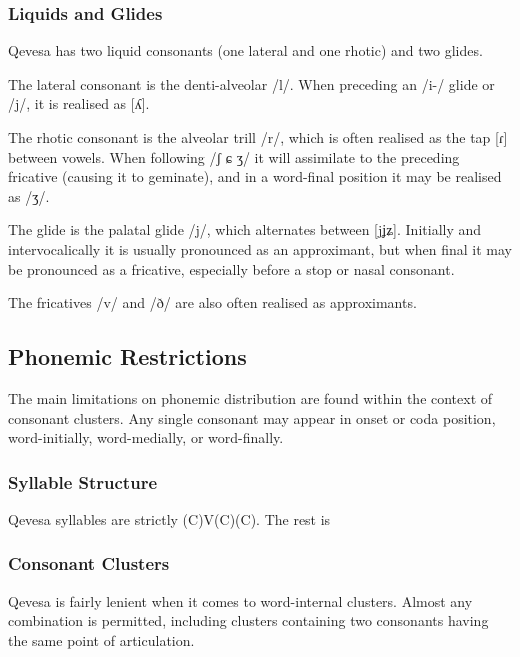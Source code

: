 \documentclass[grammar]{subfiles}
\begin{document}


\subsubsection{Liquids and Glides}
\label{sssec:liquids}

Qevesa has two liquid consonants (one lateral and one rhotic) and two glides.

The lateral consonant is the denti-alveolar /l/.  When preceding an /i-/ glide
or /j/, it is realised as [ʎ].  

The rhotic consonant is the alveolar trill /r/, which is often realised as the
tap [ɾ] between vowels.  When following /ʃ ɕ ʒ/ it will assimilate to the
preceding fricative (causing it to geminate), and in a word-final position it
may be realised as /ʒ/. 

The glide is the palatal glide /j/, which alternates between [j\tlde ʝ\tlde ʑ].
Initially and intervocalically it is usually pronounced as an approximant, but
when final it may be pronounced as a fricative, especially before a stop or
nasal consonant.  

The fricatives /v/ and /ð/ are also often realised as approximants.  


\subsection{Phonemic Restrictions}
\label{ssec:phonemic_restrictions}

The main limitations on phonemic distribution are found within the context of
consonant clusters.  Any single consonant may appear in onset or coda position,
word-initially, word-medially, or word-finally.  


\subsubsection{Syllable Structure}
\label{sssec:syllables}

Qevesa syllables are strictly (C)V(C)(C).  The rest is \tbw


\subsubsection{Consonant Clusters}
\label{sssec:consonant_clusters}

Qevesa is fairly lenient when it comes to word-internal clusters.  Almost any
combination is permitted, including clusters containing two consonants having
the same point of articulation. 
\end{document}
